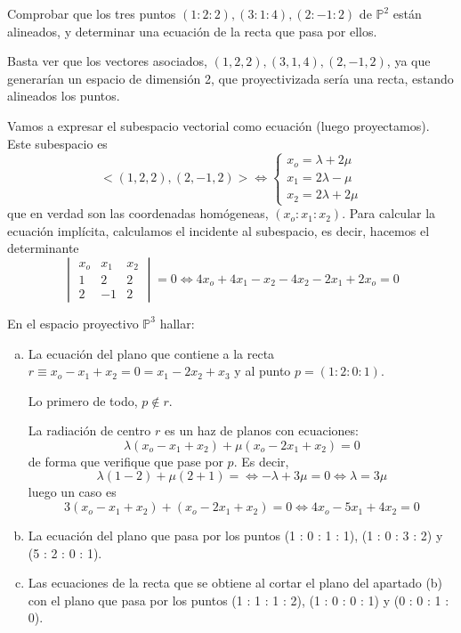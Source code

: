 \begin{ejer}
    [10] Comprobar que los tres puntos $(1 : 2 : 2),(3 : 1 : 4),(2 : -1 : 2)$ de $\mathbb P^2$ est\'an alineados, y determinar una ecuaci\'on de la recta que pasa por ellos.
\end{ejer}
\begin{sol}
    Basta ver que los vectores asociados, $(1,2,2), (3,1,4),(2,-1,2)$, ya que generar\'ian un espacio de dimensi\'on 2, que proyectivizada ser\'ia una recta, estando alineados los puntos. 

    Vamos a expresar el subespacio vectorial como ecuaci\'on (luego proyectamos). Este subespacio es
    $$<(1,2,2),(2,-1,2)> \iff \begin{cases}
        x_o = \lambda +2\mu \\ x_1 = 2 \lambda- \mu \\ x_2 = 2\lambda + 2\mu 
    \end{cases}$$
    que en verdad son las coordenadas hom\'ogeneas, $(x_o:x_1:x_2)$. Para calcular la ecuaci\'on impl\'icita, calculamos el incidente al subespacio, es decir,  hacemos el determinante
    $$\begin{vmatrix}
        x_o & x_1 & x_2 \\ 1 &2&2\\2&-1&2
    \end{vmatrix} = 0 \iff 4x_o + 4x_1 -x_2 -4x_2-2x_1+2x_o=0$$
\end{sol}
\begin{ejer}
    [15] En el espacio proyectivo $\mathbb P^3$ hallar:
    \begin{enumerate}[a)]
        \item La ecuaci\'on del plano que contiene a la recta $r \equiv x_o - x_1 + x_2 = 0 = x_1 - 2x_2 + x_3$ y
        al punto $p = (1 : 2 : 0 : 1)$.
        \begin{sol}
            Lo primero de todo, $p \nin r$.
            
            La radiaci\'on de centro $r$ es un haz de planos con ecuaciones:
            $$\lambda(x_o-x_1+x_2) + \mu(x_o-2x_1+x_2)=0$$
            de forma que verifique que pase por $p$. Es decir, 
            $$\lambda(1-2)+\mu(2+1) = \iff -\lambda+3\mu =0 \iff \lambda=3\mu$$
            luego un caso es
            $$3 (x_o-x_1+x_2) + (x_o-2x_1+x_2)=0 \iff 4x_o-5x_1+4x_2=0$$
        \end{sol}
        \item  La ecuaci\'on del plano que pasa por los puntos (1 : 0 : 1 : 1), (1 : 0 : 3 : 2) y
        (5 : 2 : 0 : 1).
        \item Las ecuaciones de la recta que se obtiene al cortar el plano del apartado (b) con el
        plano que pasa por los puntos (1 : 1 : 1 : 2), (1 : 0 : 0 : 1) y (0 : 0 : 1 : 0).
    \end{enumerate}
\end{ejer}
